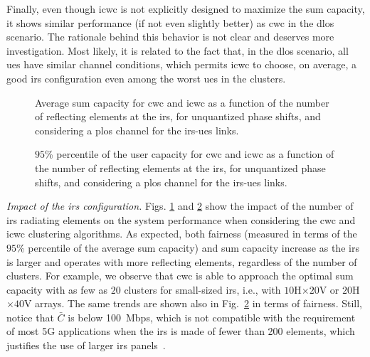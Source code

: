 Finally, even though \gls{icwc} is not explicitly designed to maximize the sum capacity, it shows similar performance (if not even slightly better) as \gls{cwc} in the \gls{dlos} scenario.
The rationale behind this behavior is not clear and deserves more investigation. Most likely, it is related to the fact that, in the \gls{dlos} scenario, all \glspl{ue} have similar channel conditions, which permits \gls{icwc} to choose, on average, a good \gls{irs} configuration even among the worst \glspl{ue} in the clusters.

\begin{figure}[t!]
    \centering
    \setlength{}
    \setlength{}
    
    \caption{Average sum capacity for \gls{cwc} and \gls{icwc} as a function of the number of reflecting elements at the \gls{irs}, for unquantized phase shifts, and considering a \gls{plos} channel for the \gls{irs}-\glspl{ue} links.}
    \label{fig:sumcap_vs_size}
\end{figure}

\begin{figure}[t!]
    \centering
    \setlength{}
    \setlength{}
    
    \caption{$95$\% percentile of the user capacity for \gls{cwc} and \gls{icwc} as a function of the number of reflecting elements at the \gls{irs}, for unquantized phase shifts, and considering a \gls{plos} channel for the \gls{irs}-\glspl{ue} links.}%
    \label{fig:quantile_vs_size}
\end{figure}

\emph{Impact of the \gls{irs} configuration.}
Figs. \ref{fig:sumcap_vs_size} and \ref{fig:quantile_vs_size} show the impact of the number of \gls{irs} radiating elements on the system performance when considering the \gls{cwc} and \gls{icwc} clustering algorithms. 
As expected, both fairness (measured in terms of the $95$\% percentile of the average sum capacity) and sum capacity increase as the \gls{irs} is larger and operates with more reflecting elements, regardless of the number of clusters.
For example, we observe that \gls{cwc} is able to approach the optimal sum capacity with as few as $20$ clusters for small-sized \gls{irs}, i.e., with $10$H$\times20$V or $20$H$\times40$V arrays. The same trends are shown also in Fig.~\ref{fig:quantile_vs_size} in terms of fairness.
Still, notice that $\bar{C}$ is below 100~Mbps, which is not compatible with the requirement of most 5G applications when the \gls{irs} is made of fewer than 200 elements, which justifies the use of larger \gls{irs} panels~\cite{pagin2022end}. 

